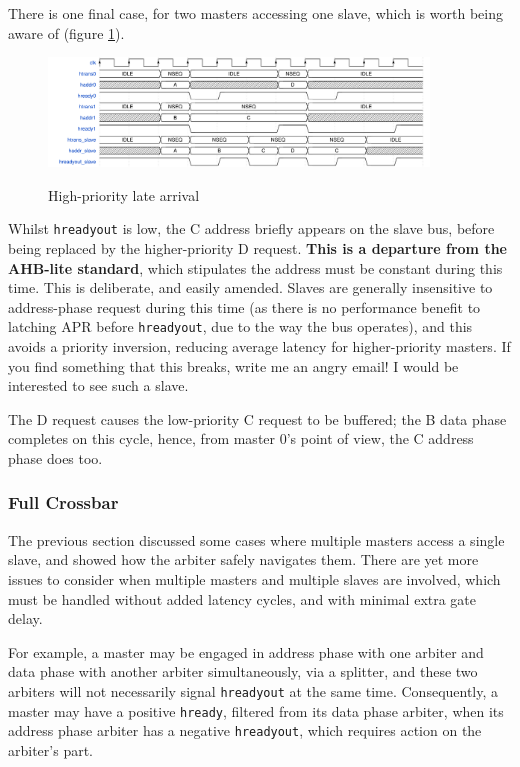 \documentclass{article}
\begin{document}
There is one final case, for two masters accessing one slave, which is worth being aware of (figure \ref{diagram:ahbl_mm_latearrival}).

\begin{figure}[H]
\centering
\caption{High-priority late arrival}
\includegraphics[width=0.9\textwidth]{waves/ahbl_mm_latearrival.pdf}
\label{diagram:ahbl_mm_latearrival}
\end{figure}

Whilst \texttt{hreadyout} is low, the C address briefly appears on the slave bus, before being replaced by the higher-priority D request. \textbf{This is a departure from the AHB-lite standard}, which stipulates the address must be constant during this time. This is deliberate, and easily amended. Slaves are generally insensitive to address-phase request during this time (as there is no performance benefit to latching APR before \texttt{hreadyout}, due to the way the bus operates), and this avoids a priority inversion, reducing average latency for higher-priority masters. If you find something that this breaks, write me an angry email! I would be interested to see such a slave.

The D request causes the low-priority C request to be buffered; the B data phase completes on this cycle, hence, from master 0's point of view, the C address phase does too.

\subsubsection{Full Crossbar}

The previous section discussed some cases where multiple masters access a single slave, and showed how the arbiter safely navigates them. There are yet more issues to consider when multiple masters and multiple slaves are involved, which must be handled without added latency cycles, and with minimal extra gate delay.

For example, a master may be engaged in address phase with one arbiter and data phase with another arbiter simultaneously, via a splitter, and these two arbiters will not necessarily signal \texttt{hreadyout} at the same time. Consequently, a master may have a positive \texttt{hready}, filtered from its data phase arbiter, when its address phase arbiter has a negative \texttt{hreadyout}, which requires action on the arbiter's part.
\end{document}
